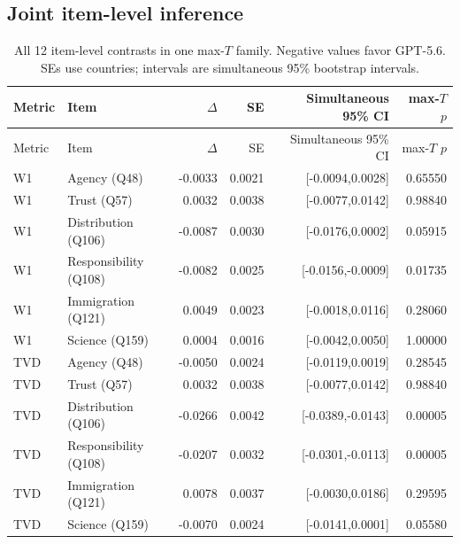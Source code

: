 \subsection{Joint item-level inference}
\begin{longtable}{llrrrr}
\caption{All 12 item-level contrasts in one max-$T$ family. Negative values favor GPT-5.6. SEs use countries; intervals are simultaneous 95\% bootstrap intervals.}\label{tab:joint-items}\\
\toprule
\rowcolor{tablehead} Metric & Item & $\Delta$ & SE & Simultaneous 95\% CI & max-$T$ $p$ \\
\midrule\endfirsthead\toprule
\rowcolor{tablehead} Metric & Item & $\Delta$ & SE & Simultaneous 95\% CI & max-$T$ $p$ \\\midrule\endhead
W1 & Agency (Q48) & -0.0033 & 0.0021 & [-0.0094,0.0028] & 0.65550 \\
W1 & Trust (Q57) & 0.0032 & 0.0038 & [-0.0077,0.0142] & 0.98840 \\
W1 & Distribution (Q106) & -0.0087 & 0.0030 & [-0.0176,0.0002] & 0.05915 \\
\rowcolor{improvebg}
W1 & Responsibility (Q108) & -0.0082 & 0.0025 & [-0.0156,-0.0009] & 0.01735 \\
W1 & Immigration (Q121) & 0.0049 & 0.0023 & [-0.0018,0.0116] & 0.28060 \\
W1 & Science (Q159) & 0.0004 & 0.0016 & [-0.0042,0.0050] & 1.00000 \\
TVD & Agency (Q48) & -0.0050 & 0.0024 & [-0.0119,0.0019] & 0.28545 \\
TVD & Trust (Q57) & 0.0032 & 0.0038 & [-0.0077,0.0142] & 0.98840 \\
\rowcolor{improvebg}
TVD & Distribution (Q106) & -0.0266 & 0.0042 & [-0.0389,-0.0143] & 0.00005 \\
\rowcolor{improvebg}
TVD & Responsibility (Q108) & -0.0207 & 0.0032 & [-0.0301,-0.0113] & 0.00005 \\
TVD & Immigration (Q121) & 0.0078 & 0.0037 & [-0.0030,0.0186] & 0.29595 \\
TVD & Science (Q159) & -0.0070 & 0.0024 & [-0.0141,0.0001] & 0.05580 \\
\bottomrule\end{longtable}
\clearpage
